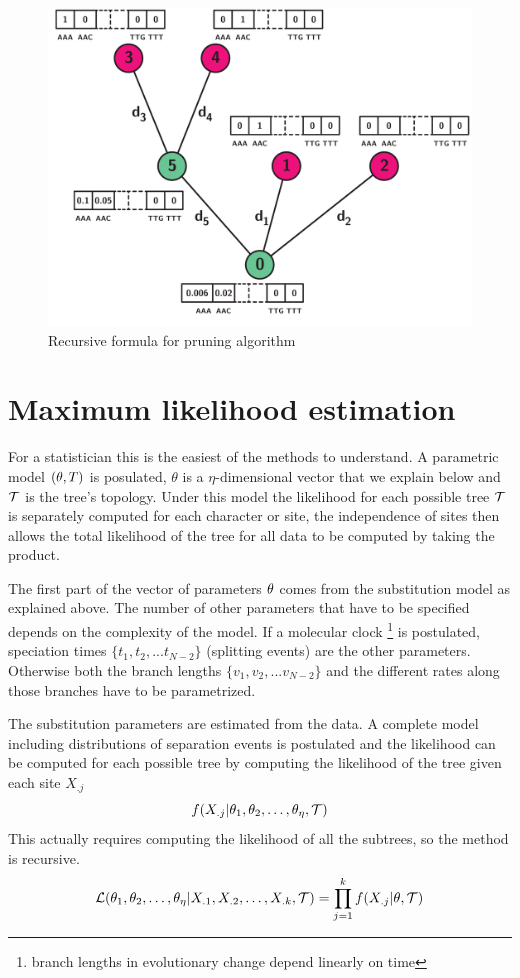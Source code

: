 \begin{figure}[thbp]
	\begin{center}
		\includegraphics[width=\textwidth] {figures/pruning-algo}
	\end{center}
	\caption{Recursive formula for pruning algorithm}
\end{figure}

\section{Maximum likelihood estimation}
For a statistician this is the easiest of the methods to
understand. A parametric model $({\bf \theta},T)$ is posulated,
$\theta$ is a $\eta$-dimensional vector that we explain below and
${\cal T}$ is the tree's topology.
Under this model
the likelihood for each possible tree ${\cal T}$ is separately computed for
each character or site, the independence of sites then allows the total
likelihood of the tree for all data 
to be computed
by taking the product.

The first part of the vector
of parameters ${\bf \theta}$ comes from
the substitution model as explained above.
The number of other parameters that have
to be specified depends on the complexity of the model.
If a molecular clock \footnote{branch lengths in evolutionary
	change
	depend linearly on time} is  postulated,
speciation times $\{t_1,t_2,...t_{N-2} \}$ (splitting events)
are the other parameters.
Otherwise both
the branch lengths $\{v_1,v_2,...v_{N-2} \}$
and the different
rates 
along those branches have to be parametrized.

The substitution parameters are estimated from the data.
A complete model including distributions of
separation events is postulated and the likelihood can be computed
for each possible tree by computing the likelihood of the tree
given each site $X_{.j}$
$$f(X_{.j}|\theta_1,\theta_2,\ldots,\theta_{\eta},{\cal T})$$
This actually requires computing the likelihood of all the
subtrees, so the method is recursive.
$${\cal L}(\theta_1,\theta_2,\ldots,\theta_{\eta}|X_{.1},X_{.2},\ldots,X_{.k},{\cal T})
=\prod_{j=1}^k f(X_{.j}|\theta,{\cal T}) $$

